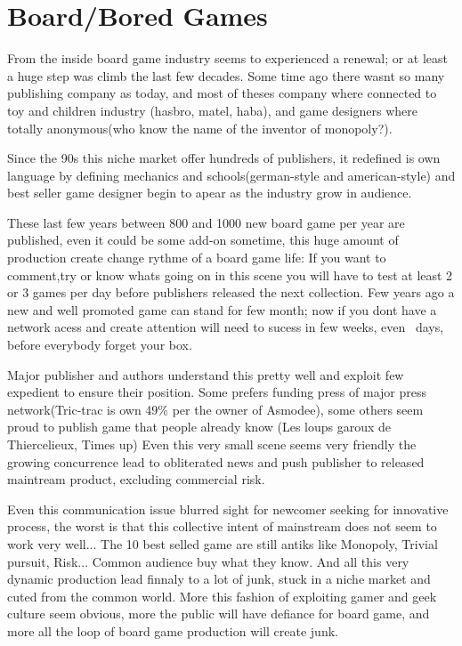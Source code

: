 \section{ Board/Bored Games}

From the inside board game industry seems to experienced a renewal; or
at least a huge step was climb the last few decades. Some time ago
there was{\textquotesingle}nt so many publishing company as today, and
most of theses company where connected to toy and children industry
(hasbro, matel, haba), and game designers where totally anonymous(who
know the name of the inventor of monopoly?). ~

Since the 90{\textquotesingle}s this niche market offer hundreds of
publishers, it redefined is own language by defining mechanics and
{\textquotedbl}schools{\textquotedbl}(german-style and american-style)
and best seller game designer begin to apear as the industry grow in
audience.~

These last few years between 800 and 1000 new board game per year are
published, even it could be some add-on sometime, this huge amount of
production create change rythme of a board game life: If you want to
comment,try or know what{\textquotesingle}s going on in this scene you
will have to test at least 2 or 3 games per day before publishers
released the next collection. Few years ago a new and well promoted
game can stand for few month; now if you don{\textquotesingle}t have a
network acess and create attention will need to sucess in few weeks,
even ~days, before everybody forget your box.

Major publisher and authors understand this pretty well and exploit few
expedient to ensure their position. Some prefers funding press of major
press network(Tric-trac is own 49\% per the owner of Asmodee), some
others seem proud to publish game that people already know (Les loups
garoux de Thiercelieux, Time{\textquotesingle}s up) Even this very
small scene seems very friendly the growing concurrence lead to
obliterated news and push publisher to released maintream product,
excluding commercial risk.

Even this communication issue blurred sight for newcomer seeking for
innovative process, the worst is that this collective intent of
mainstream does not seem to work very well... The 10 best selled game
are still antiks like Monopoly, Trivial pursuit, Risk... Common
audience buy what they know. And all this very dynamic production lead
finnaly to a lot of junk, stuck in a niche market and cuted from the
common world. More this fashion of exploiting gamer and geek culture
seem obvious, more the public will have defiance for board game, and
more all the loop of board game production will create junk.

